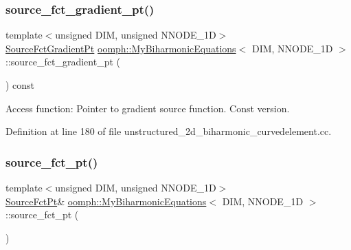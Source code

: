 \subsubsection{\texorpdfstring{source\+\_\+fct\+\_\+gradient\+\_\+pt()}{source\_fct\_gradient\_pt()}\hspace{0.1cm}{\footnotesize\ttfamily [4/4]}}
{\footnotesize\ttfamily template$<$unsigned D\+IM, unsigned N\+N\+O\+D\+E\+\_\+1D$>$ \\
\hyperlink{classoomph_1_1MyBiharmonicEquations_af007c03701e888fed7375cb4537f0046}{Source\+Fct\+Gradient\+Pt} \hyperlink{classoomph_1_1MyBiharmonicEquations}{oomph\+::\+My\+Biharmonic\+Equations}$<$ D\+IM, N\+N\+O\+D\+E\+\_\+1D $>$\+::source\+\_\+fct\+\_\+gradient\+\_\+pt (\begin{DoxyParamCaption}{ }\end{DoxyParamCaption}) const\hspace{0.3cm}{\ttfamily [inline]}}



Access function\+: Pointer to gradient source function. Const version. 



Definition at line 180 of file unstructured\+\_\+2d\+\_\+biharmonic\+\_\+curvedelement.\+cc.

\mbox{\label{classoomph_1_1MyBiharmonicEquations_afbb201cb342fef337cfce82a776fa2b3}} 
\subsubsection{\texorpdfstring{source\+\_\+fct\+\_\+pt()}{source\_fct\_pt()}\hspace{0.1cm}{\footnotesize\ttfamily [1/4]}}
{\footnotesize\ttfamily template$<$unsigned D\+IM, unsigned N\+N\+O\+D\+E\+\_\+1D$>$ \\
\hyperlink{classoomph_1_1MyBiharmonicEquations_a17bd58054c66229016eb1c52eab36bc1}{Source\+Fct\+Pt}\& \hyperlink{classoomph_1_1MyBiharmonicEquations}{oomph\+::\+My\+Biharmonic\+Equations}$<$ D\+IM, N\+N\+O\+D\+E\+\_\+1D $>$\+::source\+\_\+fct\+\_\+pt (\begin{DoxyParamCaption}{ }\end{DoxyParamCaption})\hspace{0.3cm}{\ttfamily [inline]}}



